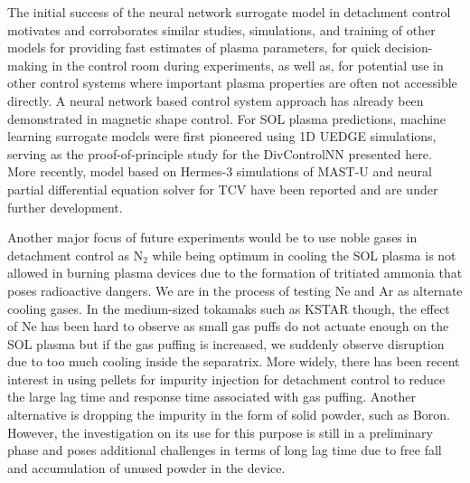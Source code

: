 The initial success of the neural network surrogate model in detachment control motivates and corroborates similar studies, simulations, and training of other models for providing fast estimates of plasma parameters, for quick decision-making in the control room during experiments, as well as, for potential use in other control systems where important plasma properties are often not accessible directly.
A neural network based control system approach has already been demonstrated in magnetic shape control\cite{Degrave_2022_Nature}.
For \ac{SOL} plasma predictions, machine learning surrogate models were first pioneered using 1D UEDGE simulations\cite{Zhu_2022_JPP}, serving as the proof-of-principle study for the DivControlNN presented here.
More recently, model based on Hermes-3\cite{Dudson_2024_CPC} simulations of MAST-U\cite{Holt_2024_NF} and neural partial differential equation solver for TCV\cite{Poels_2023_NF} have been reported and are under further development.

Another major focus of future experiments would be to use noble gases in detachment control as N$_2$ while being optimum in cooling the SOL plasma is not allowed in burning plasma devices due to the formation of tritiated ammonia that poses radioactive dangers.
We are in the process of testing Ne and Ar as alternate cooling gases.
In the medium-sized tokamaks such as KSTAR though, the effect of Ne has been hard to observe as small gas puffs do not actuate enough on the \ac{SOL} plasma but if the gas puffing is increased, we suddenly observe disruption due to too much cooling inside the separatrix.
More widely, there has been recent interest in using pellets for impurity injection for detachment control to reduce the large lag time and response time associated with gas puffing.
Another alternative is dropping the impurity in the form of solid powder, such as Boron.
However, the investigation on its use for this purpose is still in a preliminary phase and poses additional challenges in terms of long lag time due to free fall and accumulation of unused powder in the device.
